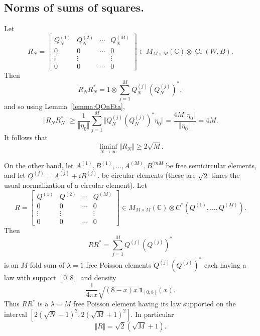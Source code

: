 \documentclass[10pt,a4paper]{amsart}
\newcommand{\Cl}{\operatorname{Cl}}
\begin{document}
\subsection{Norms of sums of squares.}
Let $$R_N = \begin{bmatrix} Q_N^{(1)} & Q_N^{(2)} & \cdots & Q_N^{(M)} \\
0 & 0 & \cdots & 0 \\
\vdots & \vdots  & & \vdots \\
0 & 0 & \cdots & 0 \end{bmatrix} \in M_{M\times M}(\mathbb{C})\otimes \Cl(W,B). $$  Then $$
R_N R_N^*  = 1\otimes \sum_{j=1}^M Q_N^{(j)} (Q_N^{(j)})^*,$$ and so using Lemma~\ref{lemma:QOnEta}, $$\Vert R_N R_N^*\Vert \geq \frac{1}{\Vert \eta_0 \Vert} \sum_{j=1}^M \Vert Q_N^{(j)} (Q_N^{(j)})^* \eta_0 \Vert = \frac{4M\Vert\eta_0\Vert}{\Vert\eta_0\Vert}=4M.
$$
It follows that $$\liminf_{N\to\infty} \Vert R_N \Vert \geq 2\sqrt{M}. $$

On the other hand, let $A^{(1)},B^{(1)},\dots,A^{(M)},B^{(mM}$ be free semicircular elements, and let $Q^{(j)}=A^{(j)} + i B^{(j)}$.  be  circular elements (these are $\sqrt{2}$ times the usual normalization of a circular element).  Let $$
R = \begin{bmatrix} Q^{(1)} & Q^{(2)} & \cdots & Q^{(M)} \\
0 & 0 & \cdots & 0 \\
\vdots & \vdots  & & \vdots \\
0 & 0 & \cdots & 0 \end{bmatrix} \in M_{M\times M}(\mathbb{C})\otimes C^*(Q^{(1)},\dots,Q^{(M)}).
$$
Then $$RR^* = \sum_{j=1}^M Q^{(j)} (Q^{(j)})^*$$ is an $M$-fold sum of $\lambda=1$ free Poisson elements $Q^{(j)}(Q^{(j)})^*$ each having a law with support $[0,8]$ and density $$
\frac{1}{4\pi x}\sqrt{(8-x)x}\,
\mathbf 1_{[0,8]}(x).
$$  
Thus $RR^*$ is a $\lambda=M$  free Poisson element having its law supported on the interval 
$[2(\sqrt{N}-1)^2,2(\sqrt{M}+1)^2]$. %
In particular $$\Vert R\Vert = \sqrt{2}(\sqrt{M}+1).$$
\end{document}
